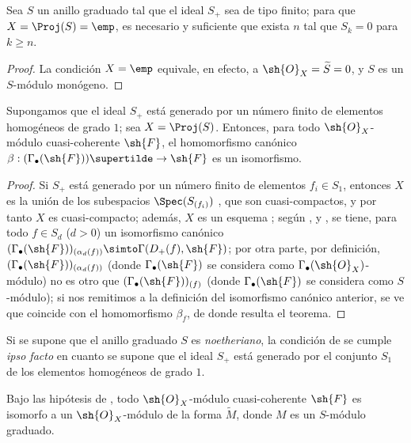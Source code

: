 \documentclass[oneside,10pt]{amsart}
\makeatletter
\renewcommand{\geq}{\geqslant}
\newcommand{\ega@arrow}[2]{\mathchoice{#1}{#2}{#2}{#2}}
\renewcommand{\to}{\ega@arrow{\longrightarrow}{\rightarrow}}
\let\EGAOriginalLabel\label
\renewcommand{\label}[1]{\phantomsection\EGAOriginalLabel{#1}}
\makeatother
\begin{document}
\begin{corollary}[2.7.4]
\label{II.2.7.4}
Sea $S$ un anillo graduado tal que el ideal $S_+$ sea de tipo finito; para que $X=\Proj(S)=\emp$, es necesario y suficiente que exista $n$ tal que $S_k=0$ para $k\geq n$.
\end{corollary}

\begin{proof}
La condición $X=\emp$ equivale, en efecto, a $\sh{O}_X=\widetilde{S}=0$, y $S$ es un $S$-módulo monógeno.
\end{proof}

\begin{theorem}[2.7.5]
\label{II.2.7.5}
Supongamos que el ideal $S_+$ está generado por un número finito de elementos homogéneos de grado $1$; sea $X=\Proj(S)$.
Entonces, para todo $\sh{O}_X$-módulo cuasi-coherente $\sh{F}$, el homomorfismo canónico $\beta:(\Gamma_\bullet(\sh{F}))\supertilde\to\sh{F}$  es un isomorfismo.
\end{theorem}

\begin{proof}
Si $S_+$ está generado por un número finito de elementos $f_i\in S_1$, entonces $X$ es la unión de los subespacios $\Spec(S_{(f_i)})$ , que son cuasi-compactos, y por tanto $X$ es cuasi-compacto; además, $X$ es un esquema ; según ,  y , se tiene, para todo $f\in S_d$ ($d>0$) un isomorfismo canónico $(\Gamma_\bullet(\sh{F}))_{(\alpha_d(f))}\simto\Gamma(D_+(f),\sh{F})$; por otra parte, por definición, $(\Gamma_\bullet(\sh{F}))_{(\alpha_d(f))}$ (donde $\Gamma_\bullet(\sh{F})$ se considera como $\Gamma_\bullet(\sh{O}_X)$-módulo) no es otro que $(\Gamma_\bullet(\sh{F}))_{(f)}$ (donde $\Gamma_\bullet(\sh{F})$ se considera como $S$-módulo); si nos remitimos a la definición  del isomorfismo canónico anterior, se ve que coincide con el homomorfismo $\beta_f$, de donde resulta el teorema.
\end{proof}

\begin{remark}[2.7.6]
\label{II.2.7.6}
Si se supone que el anillo graduado $S$ es \emph{noetheriano}, la condición de  se cumple \emph{ipso facto} en cuanto se supone que el ideal $S_+$ está generado por el conjunto $S_1$ de los elementos homogéneos de grado $1$.
\end{remark}

\begin{corollary}[2.7.7]
\label{II.2.7.7}
Bajo las hipótesis de , todo $\sh{O}_X$-módulo cuasi-coherente $\sh{F}$ es isomorfo a un $\sh{O}_X$-módulo de la forma $\widetilde{M}$, donde $M$ es un $S$-módulo graduado.
\end{corollary}
\end{document}
